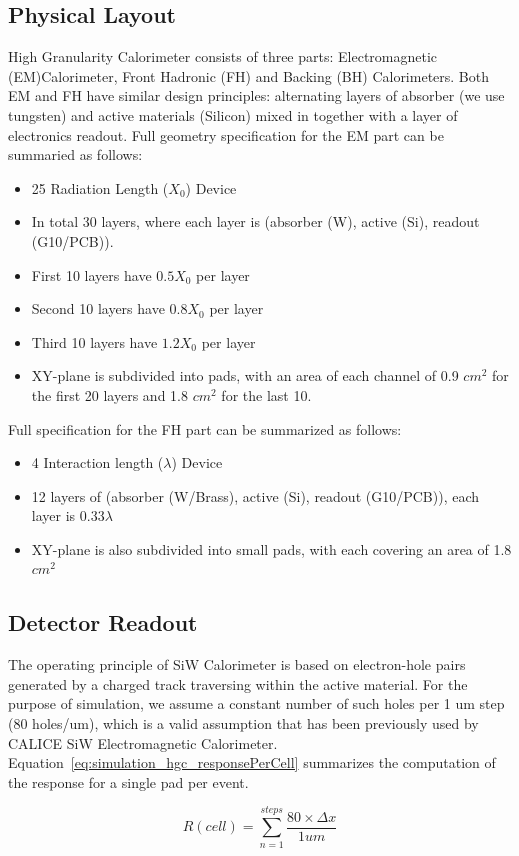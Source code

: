 \subsection{Physical Layout}
High Granularity Calorimeter consists of three parts: Electromagnetic (EM)Calorimeter, Front Hadronic (FH) and Backing (BH) Calorimeters. Both EM and FH have similar design principles: alternating layers of absorber (we use tungsten) and active materials (Silicon) mixed in together with a layer of electronics readout. Full geometry specification for the EM part can be summaried as follows:
\begin{itemize}
    \item 25 Radiation Length ($X_{0}$) Device
    \item In total 30 layers, where each layer is (absorber (W), active (Si), readout (G10/PCB)).
    \item First 10 layers have $0.5 X_{0}$ per layer
    \item Second 10 layers have $0.8 X_{0}$ per layer
    \item Third 10 layers have $1.2 X_{0}$ per layer
    \item XY-plane is subdivided into pads, with an area of each channel of 0.9 $cm^2$ for the first 20 layers and 1.8 $cm^2$ for the last 10.
\end{itemize}
Full specification for the FH part can be summarized as follows:
\begin{itemize}
    \item 4 Interaction length ($\lambda$) Device
    \item 12 layers of (absorber (W/Brass), active (Si), readout (G10/PCB)), each layer is $0.33\lambda$
    \item XY-plane is also subdivided into small pads, with each covering an area of 1.8 $cm^2$
\end{itemize}

\subsection{Detector Readout} \label{subsection:simulations_hgc_readout}
The operating principle of SiW Calorimeter is based on electron-hole pairs generated by a charged track traversing within the active material. For the purpose of simulation, we assume a constant number of such holes per 1 um step (80 holes/um), which is a valid assumption that has been previously used by CALICE SiW Electromagnetic Calorimeter. Equation~\ref{eq:simulation_hgc_responsePerCell} summarizes the computation of the response for a single pad per event.
\begin{center}
    \begin{equation}
        \label{eq:simulation_hgc_responsePerCell}
        {R(cell)} = {\sum_{n=1}^{steps} \frac{80\times \Delta x}{1um}}
   \end{equation}
\end{center}


